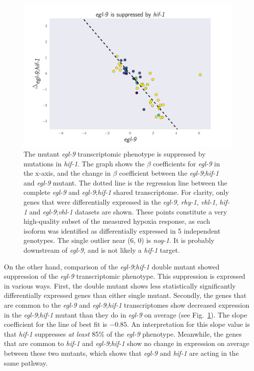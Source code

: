\documentclass[9pt,twocolumn,twoside]{pnas-new}
\newcommand{\egl}{\emph{egl-9}}
\newcommand{\nog}{\emph{nog-1}}
\newcommand{\rhy}{\emph{rhy-1}}
\newcommand{\vhl}{\emph{vhl-1}}
\newcommand{\hif}{\emph{hif-1}}
\begin{document}
\begin{figure}[tbhp]
\centering
\includegraphics[width=\linewidth]{figs/egl9_epistatic_eglhif.pdf}
\caption{
The mutant \egl{} transcriptomic phenotype is suppressed by mutations in \hif{}.
The graph shows the $\beta$ coefficients for \egl{} in the x-axis, and the change
in $\beta$ coefficient between the \egl;\hif{} and \egl{} mutant. The dotted
line is the regression line between the complete \egl{} and \egl{};\hif{} shared
transcriptome. For clarity, only genes that were differentially expressed in the
\egl{}, \rhy{}, \vhl{}, \hif{} and \egl;\vhl{} datasets are shown. These points
constitute a very high-quality subset of the measured hypoxia response, as each
isoform was identified as differentially expressed in 5 independent genotypes.
The single outlier near (6, 0) is \nog{}. It is probably downstream of
\egl{}, and is not likely a \hif{} target.
}
\label{fig:egl9epistasis}
\end{figure}

On the other hand, comparison of the \egl{};\hif{} double mutant showed
suppression of the \egl{} transcriptomic phenotype. This suppression is expressed
in various ways. First, the double mutant shows less statistically significantly
differentially expressed genes than either single mutant. Secondly, the genes
that are common to the \egl{} and \egl{};\hif{} transcriptomes show decreased
expression in the \egl{};\hif{} mutant than they do in \egl{} on average (see
Fig.~\ref{fig:egl9epistasis}). The slope coefficient for the line of best fit is
$-0.85$. An interpretation for this slope value is that \hif{} suppresses
\emph{at least} 85\% of the \egl{} phenotype. Meanwhile, the genes that are common
to \hif{} and \egl{};\hif{} show no change in expression on average between
these two mutants, which shows that \egl{} and \hif{} are acting in the same pathway.
\end{document}
